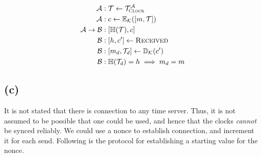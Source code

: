 \documentclass{article}
\begin{document}
\begin{align*}
    \mathcal A &: \mathcal T \leftarrow \mathcal T _{\textsc{Clock}}^{\mathcal{A}}
    \\
    \mathcal A &: c \leftarrow \mathbb E_\mathcal{K} ([m, \mathcal T]) 
    \\
    \mathcal A \rightarrow \mathcal B &: [\mathbb H (\mathcal T), c] 
    \\
   \mathcal B &: [h, c'] \leftarrow \textsc{Received} 
   \\
   \mathcal B &: [m_d, \mathcal T_d] \leftarrow \mathbb D_{\mathcal K} (c') 
   \\
   \mathcal B &: \mathbb H(\mathcal T_d) = h \implies m_d = m
\end{align*}

\newpage

\subsection*{(c)}

It is not stated that there is connection to any time server.
Thus, it is not assumed to be possible that one could be used, and hence that the clocks \textit{cannot} be synced reliably.
We could use a nonce to establish connection, and increment it for each send.
Following is the protocol for establishing a starting value for the nonce.
\end{document}
